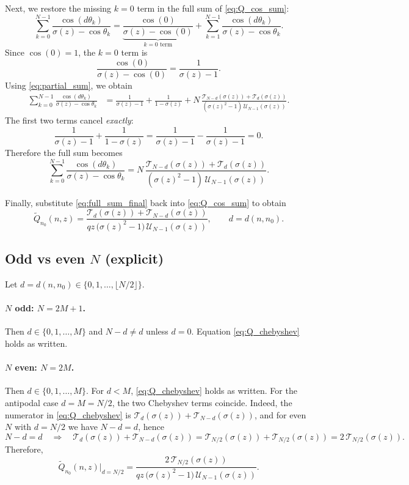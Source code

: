 \documentclass[11pt]{article}
\newcommand{\T}{\mathcal{T}}
\newcommand{\U}{\mathcal{U}}
\begin{document}
Next, we restore the missing $k=0$ term in the full sum of \eqref{eq:Q_cos_sum}:
\[
\sum_{k=0}^{N-1}\frac{\cos(d\theta_k)}{\sigma(z)-\cos\theta_k}
=
\underbrace{\frac{\cos(0)}{\sigma(z)-\cos(0)}}_{\text{$k=0$ term}}
+
\sum_{k=1}^{N-1}\frac{\cos(d\theta_k)}{\sigma(z)-\cos\theta_k}.
\]
Since $\cos(0)=1$, the $k=0$ term is
\[
\frac{\cos(0)}{\sigma(z)-\cos(0)}=\frac{1}{\sigma(z)-1}.
\]
Using \eqref{eq:partial_sum}, we obtain
\begin{align}
\sum_{k=0}^{N-1}\frac{\cos(d\theta_k)}{\sigma(z)-\cos\theta_k}
&=
\frac{1}{\sigma(z)-1}
+
\frac{1}{1-\sigma(z)}
+
N\,\frac{\T_{N-d}(\sigma(z))+\T_{d}(\sigma(z))}{(\sigma(z)^2-1)\,\U_{N-1}(\sigma(z))}.
\label{eq:full_sum_with_cancel}
\end{align}
The first two terms cancel \emph{exactly}:
\[
\frac{1}{\sigma(z)-1}+\frac{1}{1-\sigma(z)}
=
\frac{1}{\sigma(z)-1}-\frac{1}{\sigma(z)-1}=0.
\]
Therefore the full sum becomes
\begin{equation}
\sum_{k=0}^{N-1}\frac{\cos(d\theta_k)}{\sigma(z)-\cos\theta_k}
=
N\,\frac{\T_{N-d}(\sigma(z))+\T_{d}(\sigma(z))}{(\sigma(z)^2-1)\,\U_{N-1}(\sigma(z))}.
\label{eq:full_sum_final}
\end{equation}

Finally, substitute \eqref{eq:full_sum_final} back into \eqref{eq:Q_cos_sum} to obtain
\begin{equation}
\boxed{
\tilde Q_{n_0}(n,z)
=
\frac{\T_{d}(\sigma(z))+\T_{N-d}(\sigma(z))}
{qz\,\bigl(\sigma(z)^2-1\bigr)\,\U_{N-1}(\sigma(z))},
\qquad d=d(n,n_0).
}
\label{eq:Q_chebyshev}
\end{equation}

\subsection{Odd vs even $N$ (explicit)}

Let $d=d(n,n_0)\in\{0,1,\dots,\lfloor N/2\rfloor\}$.

\paragraph{$N$ odd: $N=2M+1$.}
Then $d\in\{0,1,\dots,M\}$ and $N-d\neq d$ unless $d=0$. Equation \eqref{eq:Q_chebyshev} holds as written.

\paragraph{$N$ even: $N=2M$.}
Then $d\in\{0,1,\dots,M\}$.
For $d<M$, \eqref{eq:Q_chebyshev} holds as written.
For the antipodal case $d=M=N/2$, the two Chebyshev terms coincide. Indeed, the numerator in \eqref{eq:Q_chebyshev} is
$\T_d(\sigma(z))+\T_{N-d}(\sigma(z))$, and for even $N$ with $d=N/2$ we have $N-d=d$, hence
\[
N-d=d
\quad\Rightarrow\quad
\T_d(\sigma(z))+\T_{N-d}(\sigma(z))
=\T_{N/2}(\sigma(z))+\T_{N/2}(\sigma(z))
=2\,\T_{N/2}(\sigma(z)).
\]
Therefore,
\[
\tilde Q_{n_0}(n,z)\big|_{d=N/2}
=
\frac{2\,\T_{N/2}(\sigma(z))}
{qz\,\bigl(\sigma(z)^2-1\bigr)\,\U_{N-1}(\sigma(z))}.
\]
\end{document}
